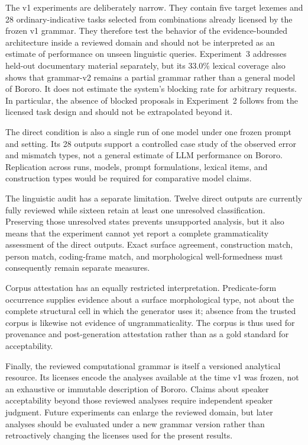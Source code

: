 \documentclass[11pt]{article}
\begin{document}
The v1 experiments are deliberately narrow. They contain five target lexemes and
28 ordinary-indicative tasks selected from combinations already licensed by the
frozen v1 grammar. They therefore test the behavior of the evidence-bounded
architecture inside a reviewed domain and should not be interpreted as an
estimate of performance on unseen linguistic queries. Experiment~3 addresses
held-out documentary material separately, but its 33.0\% lexical coverage also
shows that grammar-v2 remains a partial grammar rather than a general model of
Bororo. It does not estimate the system's blocking rate for arbitrary requests. In particular, the absence of blocked proposals in
Experiment~2 follows from the licensed task design and should not be
extrapolated beyond it.

The direct condition is also a single run of one model under one frozen prompt
and setting. Its 28 outputs support a controlled case study of the observed
error and mismatch types, not a general estimate of LLM performance on Bororo.
Replication across runs, models, prompt formulations, lexical items, and
construction types would be required for comparative model claims.

The linguistic audit has a separate limitation. Twelve direct outputs are
currently fully reviewed while sixteen retain at least one unresolved
classification. Preserving those unresolved states prevents unsupported
analysis, but it also means that the experiment cannot yet report a complete
grammaticality assessment of the direct outputs. Exact surface agreement,
construction match, person match, coding-frame match, and morphological
well-formedness must consequently remain separate measures.

Corpus attestation has an equally restricted interpretation. Predicate-form
occurrence supplies evidence about a surface morphological type, not about the
complete structural cell in which the generator uses it; absence from the
trusted corpus is likewise not evidence of ungrammaticality. The corpus is thus
used for provenance and post-generation attestation rather than as a gold
standard for acceptability.

Finally, the reviewed computational grammar is itself a versioned analytical
resource. Its licenses encode the analyses available at the time v1 was frozen,
not an exhaustive or immutable description of Bororo. Claims about speaker
acceptability beyond those reviewed analyses require independent speaker
judgment. Future experiments can enlarge the reviewed domain, but later
analyses should be evaluated under a new grammar version rather than
retroactively changing the licenses used for the present results.
\end{document}
